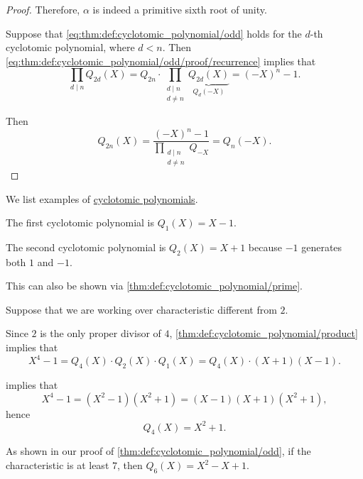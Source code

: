 \begin{proof}
  Therefore, \( \alpha \) is indeed a primitive sixth root of unity.

   Suppose that \eqref{eq:thm:def:cyclotomic_polynomial/odd} holds for the \( d \)-th cyclotomic polynomial, where \( d < n \). Then \eqref{eq:thm:def:cyclotomic_polynomial/odd/proof/recurrence} implies that
  \begin{equation*}
    \prod_{d \mid n} Q_{2d}(X) = Q_{2n} \cdot \prod_{\substack{d \mid n \\ d \neq n}} \underbrace{Q_{2d}(X)}_{Q_d(-X)} = (-X)^n - 1.
  \end{equation*}

  Then
  \begin{equation*}
    Q_{2n}(X) = \frac {(-X)^n - 1} {\displaystyle \prod_{\substack{d \mid n \\ d \neq n}} Q_{-X}} = Q_n(-X).
  \end{equation*}
\end{proof}

\begin{example}\label{ex:def:cyclotomic_polynomial}
  We list examples of \hyperref[def:cyclotomic_polynomial]{cyclotomic polynomials}.
  \begin{thmenum}
     The first cyclotomic polynomial is \( Q_1(X) = X - 1 \).

     The second cyclotomic polynomial is \( Q_2(X) = X + 1 \) because \( -1 \) generates both \( 1 \) and \( -1 \).

    This can also be shown via \cref{thm:def:cyclotomic_polynomial/prime}.

     Suppose that we are working over characteristic different from \( 2 \).

    Since \( 2 \) is the only proper divisor of \( 4 \), \cref{thm:def:cyclotomic_polynomial/product} implies that
    \begin{equation*}
      X^4 - 1 = Q_4(X) \cdot Q_2(X) \cdot Q_1(X) = Q_4(X) \cdot (X + 1) (X - 1).
    \end{equation*}

     implies that
    \begin{equation*}
      X^4 - 1 = (X^2 - 1) (X^2 + 1) = (X - 1) (X + 1) (X^2 + 1),
    \end{equation*}
    hence
    \begin{equation*}
      Q_4(X) = X^2 + 1.
    \end{equation*}

     As shown in our proof of \cref{thm:def:cyclotomic_polynomial/odd}, if the characteristic is at least \( 7 \), then \( Q_6(X) = X^2 - X + 1 \).
  \end{thmenum}
\end{example}

